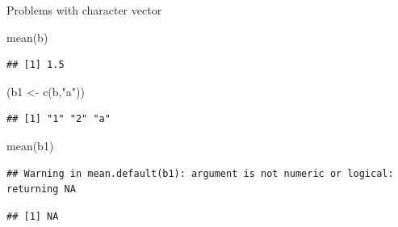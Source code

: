 \documentclass[
  10pt,
  ignorenonframetext,
]{beamer}
\newenvironment{Shaded}{\begin{snugshade}}{\end{snugshade}}
\newcommand{\KeywordTok}[1]{\textcolor[rgb]{0.94,0.87,0.69}{#1}}
\newcommand{\NormalTok}[1]{\textcolor[rgb]{0.80,0.80,0.80}{#1}}
\newcommand{\StringTok}[1]{\textcolor[rgb]{0.80,0.58,0.58}{#1}}
\begin{document}
\begin{frame}[fragile]{Problems with character vector}
\protect\hypertarget{problems-with-character-vector}{}

\begin{Shaded}
\begin{Highlighting}[]
\KeywordTok{mean}\NormalTok{(b)}
\end{Highlighting}
\end{Shaded}

\begin{verbatim}
## [1] 1.5
\end{verbatim}

\begin{Shaded}
\begin{Highlighting}[]
\NormalTok{(b1 <-}\StringTok{ }\KeywordTok{c}\NormalTok{(b,}\StringTok{"a"}\NormalTok{))}
\end{Highlighting}
\end{Shaded}

\begin{verbatim}
## [1] "1" "2" "a"
\end{verbatim}

\begin{Shaded}
\begin{Highlighting}[]
\KeywordTok{mean}\NormalTok{(b1)}
\end{Highlighting}
\end{Shaded}

\begin{verbatim}
## Warning in mean.default(b1): argument is not numeric or logical: returning NA
\end{verbatim}

\begin{verbatim}
## [1] NA
\end{verbatim}

\end{frame}
\end{document}

